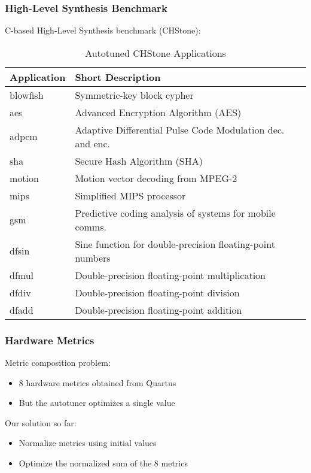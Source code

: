 \documentclass[10pt, compress, xcolor={table,xcdraw,usenames}, aspectratio=169]{beamer}
\begin{document}
\begin{frame}
    \frametitle{High-Level Synthesis Benchmark}
    \begin{block}{C-based High-Level Synthesis \alert{benchmark}
        (\alert{CHStone}):}
        \begin{table}[htpb]
            \footnotesize
            \caption{Autotuned CHStone Applications}
            \centering
            \begin{tabular}{@{}p{}p{}@{}}
                \toprule
                Application & Short Description \\ \midrule
                blowfish & Symmetric-key block cypher \\
                aes & Advanced Encryption Algorithm (AES) \\
                adpcm & Adaptive Differential Pulse Code Modulation dec. and enc. \\
                sha & Secure Hash Algorithm (SHA) \\
                motion & Motion vector decoding from MPEG-2 \\
                mips & Simplified MIPS processor \\
                gsm & Predictive coding analysis of systems for mobile comms. \\
                dfsin & Sine function for double-precision floating-point numbers \\
                dfmul & Double-precision floating-point multiplication \\
                dfdiv & Double-precision floating-point division \\
                dfadd & Double-precision floating-point addition \\ \bottomrule
            \end{tabular}
        \end{table}
    \end{block}
\end{frame}

\begin{frame}
    \frametitle{Hardware Metrics}
    \begin{block}{\alert{Metric composition} problem:}
        \begin{itemize}
            \item \alert{8 hardware metrics} obtained from Quartus
            \item But the autotuner optimizes \alert{a single value}
        \end{itemize}
    \end{block}

    \begin{block}{Our \alert{solution} so far:}
        \begin{itemize}
            \item \alert{Normalize} metrics using initial values
            \item Optimize the \alert{normalized sum} of the 8 metrics
        \end{itemize}
    \end{block}
\end{frame}
\end{document}
